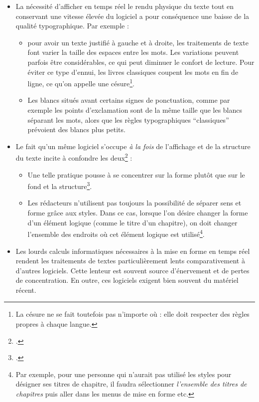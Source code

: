 \begin{itemize}
\item La nécessité d'afficher en temps réel le rendu physique du texte tout en conservant une vitesse élevée du logiciel a pour conséquence une baisse de la qualité typographique. Par exemple :
	\begin{itemize}
		\item pour avoir un texte justifié à gauche et à droite, les traitements de texte font varier la taille des espaces entre les mots. Les variations peuvent parfois être considérables, ce qui peut diminuer le confort de lecture. Pour éviter ce type d'ennui, les livres classiques coupent les mots en fin de ligne, ce qu'on appelle une césure\footnote{La césure ne se fait toutefois pas n'importe où : elle doit respecter des règles propres à chaque langue.}.
		\item Les blancs situés avant certains signes de ponctuation, comme par exemple les points d'exclamation sont de  la même taille que les blancs séparant les mots, alors que les règles typographiques \enquote{classiques} prévoient des blancs plus petits.
	\end{itemize}
\item Le fait qu'un même logiciel s'occupe \emph{à la fois} de l'affichage et de la structure du texte incite à confondre les deux\footcite[L'auteur de ces lignes est moins sévère envers les traitements de texte que d'autres LaTeXiens : \cf][]{stupide}  :
	\begin{itemize}
		\item Une telle pratique pousse à se concentrer sur la forme plutôt que sur le fond et la structure\footcite[Toutefois en théorie la formation universitaire en sciences humaines incite à penser \emph{structure et sens d'abord}. Voir un débat sur le blog de l'auteur :][]{structurevsforme}. 
		\item Les rédacteurs n'utilisent pas toujours la possibilité de séparer sens et forme grâce aux styles. Dans ce cas, lorsque l'on désire changer la forme d'un élément logique (comme  le titre d'un chapitre), on doit changer l'ensemble des endroits où cet élément logique est utilisé\footnote{Par exemple, pour une personne  qui n'aurait pas utilisé les styles pour désigner ses titres de chapitre, il faudra sélectionner \emph{l'ensemble des titres de chapitres} puis aller dans les menus de mise en forme etc.}.
	\end{itemize}

\item Les lourds calculs informatiques nécessaires à la mise en forme en temps réel rendent les traitements de textes particulièrement lents comparativement à d'autres logiciels. Cette lenteur est souvent source d'énervement et de pertes de concentration. En outre, ces logiciels exigent bien souvent du matériel récent.
\end{itemize}

